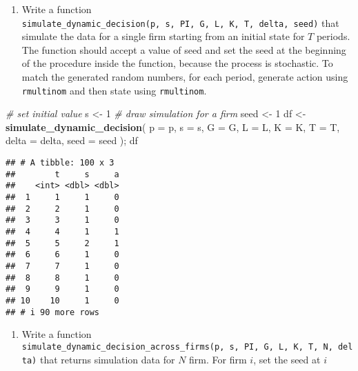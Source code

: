 \documentclass[
]{book}
\newenvironment{Shaded}{\begin{snugshade}}{\end{snugshade}}
\newcommand{\AttributeTok}[1]{\textcolor[rgb]{0.13,0.29,0.53}{#1}}
\newcommand{\CommentTok}[1]{\textcolor[rgb]{0.56,0.35,0.01}{\textit{#1}}}
\newcommand{\DecValTok}[1]{\textcolor[rgb]{0.00,0.00,0.81}{#1}}
\newcommand{\FunctionTok}[1]{\textcolor[rgb]{0.13,0.29,0.53}{\textbf{#1}}}
\newcommand{\NormalTok}[1]{#1}
\newcommand{\OtherTok}[1]{\textcolor[rgb]{0.56,0.35,0.01}{#1}}
\providecommand{\tightlist}{%
  \setlength{\itemsep}{0pt}\setlength{\parskip}{0pt}}
\begin{document}
\begin{enumerate}
\def\labelenumi{\arabic{enumi}.}
\setcounter{enumi}{6}
\tightlist
\item
  Write a function \texttt{simulate\_dynamic\_decision(p,\ s,\ PI,\ G,\ L,\ K,\ T,\ delta,\ seed)} that simulate the data for a single firm starting from an initial state for \(T\) periods. The function should accept a value of seed and set the seed at the beginning of the procedure inside the function, because the process is stochastic. To match the generated random numbers, for each period, generate action using \texttt{rmultinom} and then state using \texttt{rmultinom}.
\end{enumerate}

\begin{Shaded}
\begin{Highlighting}[]
\CommentTok{\# set initial value}
\NormalTok{s }\OtherTok{\textless{}{-}} \DecValTok{1}
\CommentTok{\# draw simulation for a firm}
\NormalTok{seed }\OtherTok{\textless{}{-}} \DecValTok{1}
\NormalTok{df }\OtherTok{\textless{}{-}} 
  \FunctionTok{simulate\_dynamic\_decision}\NormalTok{(}
    \AttributeTok{p =}\NormalTok{ p, }
    \AttributeTok{s =}\NormalTok{ s, }
    \AttributeTok{G =}\NormalTok{ G, }
    \AttributeTok{L =}\NormalTok{ L, }
    \AttributeTok{K =}\NormalTok{ K, }
    \AttributeTok{T =}\NormalTok{ T, }
    \AttributeTok{delta =}\NormalTok{ delta, }
    \AttributeTok{seed =}\NormalTok{ seed}
\NormalTok{    ); }
\NormalTok{df}
\end{Highlighting}
\end{Shaded}

\begin{verbatim}
## # A tibble: 100 x 3
##        t     s     a
##    <int> <dbl> <dbl>
##  1     1     1     0
##  2     2     1     0
##  3     3     1     0
##  4     4     1     1
##  5     5     2     1
##  6     6     1     0
##  7     7     1     0
##  8     8     1     0
##  9     9     1     0
## 10    10     1     0
## # i 90 more rows
\end{verbatim}

\begin{enumerate}
\def\labelenumi{\arabic{enumi}.}
\setcounter{enumi}{7}
\tightlist
\item
  Write a function \texttt{simulate\_dynamic\_decision\_across\_firms(p,\ s,\ PI,\ G,\ L,\ K,\ T,\ N,\ delta)} that returns simulation data for \(N\) firm. For firm \(i\), set the seed at \(i\)
\end{enumerate}
\end{document}

